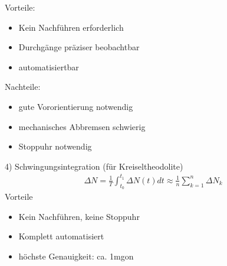 \documentclass[12pt]{article}
\begin{document}
Vorteile:
\begin{itemize}
	\item Kein Nachführen erforderlich
	\item Durchgänge präziser beobachtbar
	\item automatisiertbar
\end{itemize}
Nachteile:
\begin{itemize}
	\item gute Vororientierung notwendig
	\item mechanisches Abbremsen schwierig
	\item Stoppuhr notwendig
\end{itemize}
4) Schwingungsintegration (für Kreiseltheodolite)
\begin{gather*}
	\Delta N = \frac{1}{T} \int_{t_0}^{t_1} \Delta N(t) dt \approx \frac{1}{n} \sum_{k=1}^{n} \Delta N_k
\end{gather*}
Vorteile
\begin{itemize}
	\item Kein Nachführen, keine Stoppuhr
	\item Komplett automatisiert
	\item höchste Genauigkeit: ca. 1mgon
\end{itemize}
\end{document}
